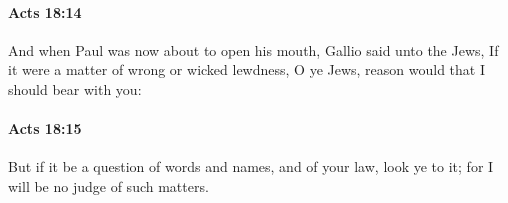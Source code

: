 		\paragraph{Acts 18:14} %
			\label{ACTS-18-14}

			And when Paul was now about to open his mouth, Gallio said unto the Jews, If it were a matter of wrong or wicked lewdness, O ye Jews, reason would that I should bear with you:

			\begin{framed}
			\scriptsize
				\begin{compactdesc}
					\item[SBLG] 
				\end{compactdesc}
			\end{framed}

		\paragraph{Acts 18:15} %
			\label{ACTS-18-15}

			But if it be a question of words and names, and of your law, look ye to it; for I will be no judge of such matters.

